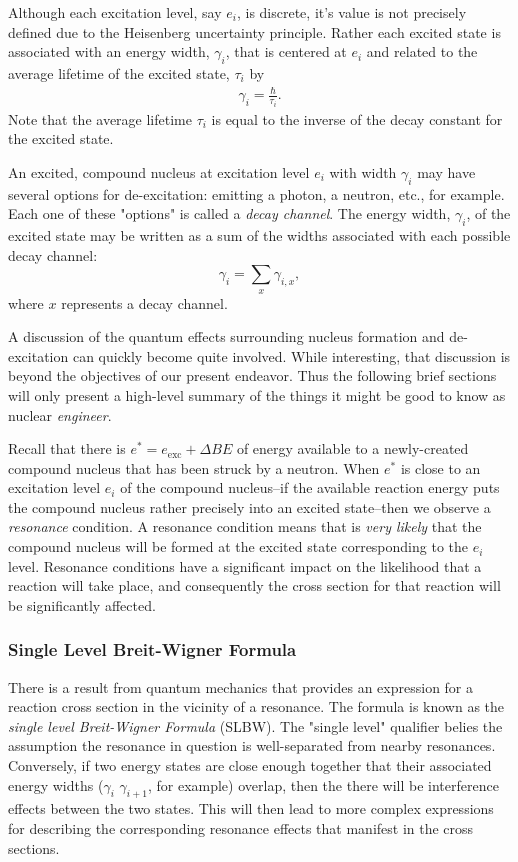 \documentclass[11pt]{article}
\begin{document}
Although each excitation level, say \(e_i\), is discrete, it's value is not precisely defined due to the Heisenberg uncertainty principle.  Rather each excited state is associated with an energy width, \(\gamma_i\), that is centered at \(e_i\) and related to the average lifetime of the excited state, \(\tau_i\) by
\begin{align}
  \gamma_i = \frac{\hbar}{\tau_i}.
\end{align}
Note that the average lifetime \(\tau_i\) is equal to the inverse of the decay constant for the excited state.

An excited, compound nucleus at excitation level \(e_i\) with width \(\gamma_i\) may have several options for de-excitation: emitting a photon, a neutron, etc., for example.  Each one of these "options" is called a \emph{decay channel}.  The energy width, \(\gamma_i\), of the excited state may be written as a sum of the widths associated with each possible decay channel:
\begin{equation}
  \gamma_i = \sum_x \gamma_{i,x},
\end{equation}
where \(x\) represents a decay channel.

A discussion of the quantum effects surrounding nucleus formation and de-excitation can quickly become quite involved.  While interesting, that discussion is beyond the objectives of our present endeavor.  Thus the following brief sections will only present a high-level summary of the things it might be good to know as nuclear \emph{engineer}.

Recall that there is \(e^* = e_{\text{exc}} + \Delta BE\) of energy available to a newly-created compound nucleus that has been struck by a neutron.  When \(e^*\) is close to an excitation level \(e_i\) of the compound nucleus--if the available reaction energy puts the compound nucleus rather precisely into an excited state--then we observe a \emph{resonance} condition.  A resonance condition means that is \emph{very likely} that the compound nucleus will be formed at the excited state corresponding to the \(e_i\) level.  Resonance conditions have a significant impact on the likelihood that a reaction will take place, and consequently the cross section for that reaction will be significantly affected.

\subsubsection{Single Level Breit-Wigner Formula}
\label{sec:orgheadline14}
There is a result from quantum mechanics that provides an expression for a reaction cross section in the vicinity of a resonance.  The formula is known as the \emph{single level Breit-Wigner Formula} (SLBW).  The "single level" qualifier belies the assumption the resonance in question is well-separated from nearby resonances.  Conversely, if two energy states are close enough together that their associated energy widths (\(\gamma_i\) \(\gamma_{i+1}\), for example) overlap, then the there will be interference effects between the two states.  This will then lead to more complex expressions for describing the corresponding resonance effects that manifest in the cross sections.
\end{document}
